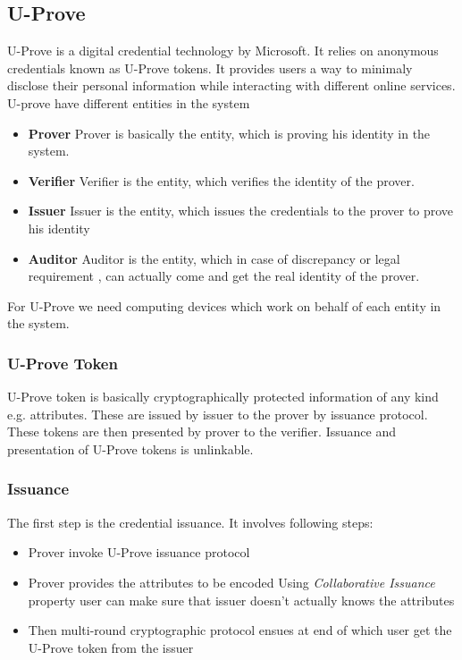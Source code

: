 \subsection{U-Prove}
U-Prove is a digital credential technology by Microsoft. It relies on anonymous credentials known as U-Prove tokens. It provides users a way to minimaly disclose their personal information while interacting with different online services. U-prove have different entities in the system
\begin{itemize}
	\item \textbf{Prover} Prover is basically the entity, which is proving his identity in the system.
	\item \textbf{Verifier} Verifier is the entity, which verifies the identity of the prover.
	\item \textbf{Issuer} Issuer is the entity, which issues the credentials to the prover to prove his identity
	\item \textbf{Auditor} Auditor is the entity, which in case of discrepancy or legal requirement , can actually come and get the real identity of the prover.
\end{itemize}
For U-Prove we need computing devices which work on behalf of each entity in the system.
\subsubsection{U-Prove Token}
U-Prove token is basically cryptographically protected information of any kind e.g. attributes. These are issued by issuer to the prover by issuance protocol. These tokens are then presented by prover to the verifier. Issuance and presentation of U-Prove tokens is unlinkable.
\subsubsection{Issuance}
The first step is the credential issuance. It involves following steps:
\begin{itemize}
	\item Prover invoke U-Prove issuance protocol
	\item Prover provides the attributes to be encoded
	\subitem Using \textit{Collaborative Issuance} property user can make sure that issuer doesn’t actually knows the attributes
	\item Then multi-round cryptographic protocol ensues at end of which user get the U-Prove token from the issuer
\end{itemize}
